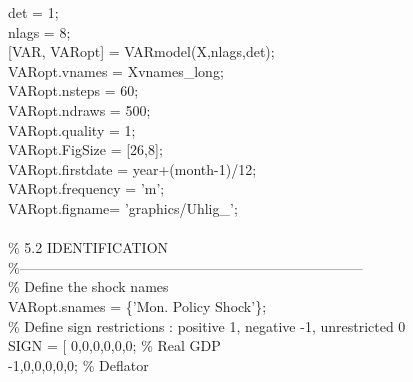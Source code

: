 \hspace{1mm}det = 1; \\ 
\hspace{1mm}nlags = 8; \\ 
\hspace{1mm}[VAR, VARopt] = VARmodel(X,nlags,det); \\ 
\hspace{1mm}VARopt.vnames = Xvnames\_long; \\ 
\hspace{1mm}VARopt.nsteps = 60; \\ 
\hspace{1mm}VARopt.ndraws = 500; \\ 
\hspace{1mm}VARopt.quality = 1; \\ 
\hspace{1mm}VARopt.FigSize = [26,8]; \\ 
\hspace{1mm}VARopt.firstdate = year+(month-1)/12; \\ 
\hspace{1mm}VARopt.frequency = \textcolor{matlabpurple}{'m'}; \\ 
\hspace{1mm}VARopt.figname= \textcolor{matlabpurple}{'graphics/Uhlig\_'}; \\ 
\hspace{1mm} \\ 
\hspace{1mm}\textcolor{matlabgreen}{\% 5.2 IDENTIFICATION }\\ 
\hspace{1mm}\textcolor{matlabgreen}{\%--------------------------------------------------------------------------  }\\ 
\hspace{1mm}\textcolor{matlabgreen}{\% Define the shock names }\\ 
\hspace{1mm}VARopt.snames = \{\textcolor{matlabpurple}{'Mon. Policy Shock'}\}; \\ 
\hspace{1mm}\textcolor{matlabgreen}{\% Define sign restrictions : positive 1, negative -1, unrestricted 0 }\\ 
\hspace{1mm}SIGN = [ 0,0,0,0,0,0;  \textcolor{matlabgreen}{\% Real GDP }\\ 
\hspace{1mm}-1,0,0,0,0,0;  \textcolor{matlabgreen}{\% Deflator }\\ 
